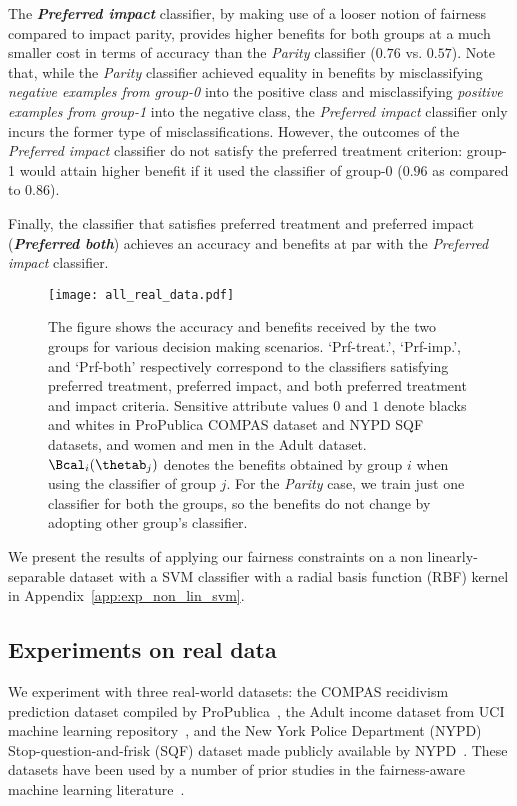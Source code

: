 \documentclass{article}
\newcommand{\xhdr}[1]{\vspace{0mm}\noindent{{\bf #1.}}}
\newcommand{\emphb}[1]{\textbf{\emph{#1}}}
\begin{document}
The \emphb{Preferred impact} classifier, by making use of a looser notion of fairness compared to impact parity, provides higher benefits for both groups at a much smaller
cost in terms of accuracy than the \emph{Parity} classifier ($0.76$ vs. $0.57$).
Note that, while the \emph{Parity} classifier achieved equality in benefits by misclassifying \textit{negative examples from group-0} into the positive class and misclassifying \textit{positive
examples from group-1} into the negative class, the \emph{Preferred impact} classifier only incurs the former type of misclassifications.
However, the outcomes of the \emph{Preferred impact} classifier do not satisfy the preferred treatment criterion: group-1 would attain higher benefit if it used the classifier of group-0 ($0.96$
as compared to $0.86$).

Finally, the classifier that satisfies preferred treatment and preferred impact (\emphb{Preferred both}) achieves an accuracy and benefits at par with the \emph{Preferred impact} classifier.


\begin{figure*}[t]
 \centering
    \texttt{[image: all\_real\_data.pdf]}
    \caption{
    The figure shows the accuracy and benefits received by the two groups for various decision making scenarios. `Prf-treat.', `Prf-imp.', and `Prf-both' respectively correspond to the classifiers satisfying preferred treatment, preferred impact, and both preferred treatment and impact criteria.
    Sensitive attribute values $0$ and $1$ denote blacks and whites in ProPublica COMPAS dataset and NYPD SQF datasets, and women and men in the Adult dataset.
    $\Bcal_{i}(\thetab_j)$ denotes the benefits obtained by group $i$ when using the classifier of group $j$.
    For the \emph{Parity} case, we train just one classifier for both the groups, so the benefits do not change by adopting other group's classifier.
    }
    \vspace{-5mm}
    \label{fig:real}
\end{figure*}


We present the results of applying our fairness constraints on a non linearly-separable dataset with a SVM classifier with a radial basis function (RBF) kernel in Appendix~\ref{app:exp_non_lin_svm}.

\vspace{-3mm}
\subsection{Experiments on real data}
\vspace{-2mm}
\xhdr{Dataset description and experimental setup} We experiment with three real-world datasets: the COMPAS recidivism prediction dataset compiled by ProPublica~\cite{propublica_compas}, the
Adult income dataset from UCI machine learning repository~\cite{adult_dataset}, and the New York Police Department (NYPD) Stop-question-and-frisk (SQF) dataset made publicly available by
NYPD~\cite{sqf_dataset}. These datasets have been used by a number of prior studies in the fairness-aware machine learning literature~\cite{feldman_kdd15,goel_frisk,zafar_dmt,icml2013_zemel13,zafar_fairness}.
\end{document}
